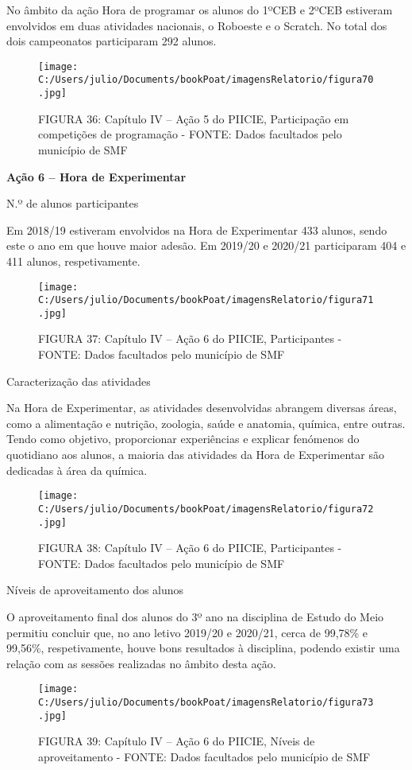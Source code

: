 \documentclass[
]{book}
\begin{document}
No âmbito da ação Hora de programar os alunos do 1ºCEB e 2ºCEB estiveram envolvidos em duas atividades nacionais, o Roboeste e o Scratch. No total dos dois campeonatos participaram 292 alunos.

\begin{figure}
\centering
\texttt{[image: C:/Users/julio/Documents/bookPoat/imagensRelatorio/figura70.jpg]}
\caption{FIGURA 36: Capítulo IV -- Ação 5 do PIICIE, Participação em competições de programação - FONTE: Dados facultados pelo município de SMF}
\end{figure}

\textbf{Ação 6 -- Hora de Experimentar}

N.º de alunos participantes

Em 2018/19 estiveram envolvidos na Hora de Experimentar 433 alunos, sendo este o ano em que houve maior adesão. Em 2019/20 e 2020/21 participaram 404 e 411 alunos, respetivamente.

\begin{figure}
\centering
\texttt{[image: C:/Users/julio/Documents/bookPoat/imagensRelatorio/figura71.jpg]}
\caption{FIGURA 37: Capítulo IV -- Ação 6 do PIICIE, Participantes - FONTE: Dados facultados pelo município de SMF}
\end{figure}

Caracterização das atividades

Na Hora de Experimentar, as atividades desenvolvidas abrangem diversas áreas, como a alimentação e nutrição, zoologia, saúde e anatomia, química, entre outras. Tendo como objetivo, proporcionar experiências e explicar fenómenos do quotidiano aos alunos, a maioria das atividades da Hora de Experimentar são dedicadas à área da química.

\begin{figure}
\centering
\texttt{[image: C:/Users/julio/Documents/bookPoat/imagensRelatorio/figura72.jpg]}
\caption{FIGURA 38: Capítulo IV -- Ação 6 do PIICIE, Participantes - FONTE: Dados facultados pelo município de SMF}
\end{figure}

Níveis de aproveitamento dos alunos

O aproveitamento final dos alunos do 3º ano na disciplina de Estudo do Meio permitiu concluir que, no ano letivo 2019/20 e 2020/21, cerca de 99,78\% e 99,56\%, respetivamente, houve bons resultados à disciplina, podendo existir uma relação com as sessões realizadas no âmbito desta ação.

\begin{figure}
\centering
\texttt{[image: C:/Users/julio/Documents/bookPoat/imagensRelatorio/figura73.jpg]}
\caption{FIGURA 39: Capítulo IV -- Ação 6 do PIICIE, Níveis de aproveitamento - FONTE: Dados facultados pelo município de SMF}
\end{figure}
\end{document}
